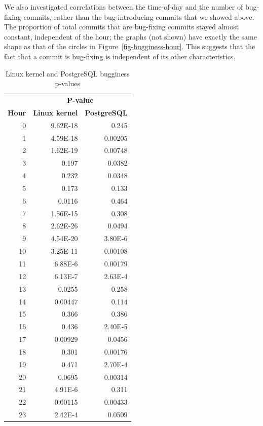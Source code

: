 
We also investigated correlations between the time-of-day and the number of
bug-fixing commits, rather than the bug-introducing commits that we showed
above. The proportion of total commits that are bug-fixing commits
stayed almost constant, independent of the hour; the graphs (not shown) have
exactly the same shape as that of the circles in
Figure~\ref{fig-bugginess-hour}. This suggests that the fact that a commit is
bug-fixing is independent of its other characteristics.

\begin{table}[tbh!]
\begin{center}
\small
\begin{tabular}{r|r|r}
\multicolumn{1}{c}{} & \multicolumn{2}{c}{{\bf P-value}} \\
\multicolumn{1}{c|}{{\bf Hour}} & \multicolumn{1}{c|}{{\bf Linux kernel}} &
\multicolumn{1}{c}{{\bf PostgreSQL}} \\
\hline
0  & 9.62E-18 & 0.245   \\
1  & 4.59E-18 & 0.00205 \\
2  & 1.62E-19 & 0.00748 \\
3  & 0.197    & 0.0382  \\
4  & 0.232    & 0.0348  \\
5  & 0.173    & 0.133   \\
6  & 0.0116   & 0.464   \\
7  & 1.56E-15 & 0.308   \\
8  & 2.62E-26 & 0.0494  \\
9  & 4.54E-20 & 3.80E-6 \\
10 & 3.25E-11 & 0.00108 \\
11 & 6.88E-6  & 0.00179 \\
12 & 6.13E-7  & 2.63E-4 \\
13 & 0.0255   & 0.258   \\
14 & 0.00447  & 0.114   \\
15 & 0.366    & 0.386   \\
16 & 0.436    & 2.40E-5 \\
17 & 0.00929  & 0.0456  \\
18 & 0.301    & 0.00176 \\
19 & 0.471    & 2.70E-4 \\
20 & 0.0695   & 0.00314 \\
21 & 4.91E-6  & 0.311   \\
22 & 0.00115  & 0.00433 \\
23 & 2.42E-4  & 0.0509  \\
\end{tabular}
\end{center}
\caption{\label{tbl-pvalues}Linux kernel and PostgreSQL bugginess p-values}
\end{table}

